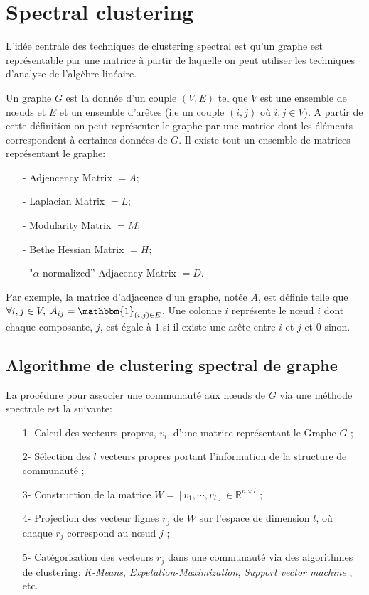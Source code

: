 \section{Spectral clustering}
L'idée centrale des techniques de clustering spectral est qu'un graphe est représentable par une matrice à partir de laquelle on peut utiliser les techniques d'analyse de l'algèbre linéaire.

Un graphe $G$ est la donnée d'un couple $(V, E)$ tel que $V$ est une ensemble de nœuds et $E$ et un ensemble d'arêtes (i.e un couple $(i,j)$ où $i,j \in V$).
A partir de cette définition on peut représenter le graphe par une matrice dont les éléments correspondent à certaines données de $G$.
Il existe tout un ensemble de matrices représentant le graphe:
\begin{itemize}
  	\item[-]  Adjencency Matrix $= A$;
  	\item[-]  Laplacian Matrix $= L$;
  	\item[-]  Modularity Matrix $= M$;
  	\item[-]  Bethe Hessian Matrix $= H$;
  	\item[-]  "$\alpha$-normalized” Adjacency Matrix $= D$.\\
\end{itemize}
Par exemple, la matrice d'adjacence d'un graphe, notée $A$, est définie telle que $\forall i,j \in V, \; A_{ij} = \mathbbm{1}_{(i,j) \in E}$.
Une colonne $i$ représente le nœud $i$ dont chaque composante, $j$, est égale à $1$ si il existe une arête entre $i$ et $j$ et $0$ sinon.\\

\subsection{Algorithme de clustering spectral de graphe}
 \label{par:algo spectral clustering}
La procédure pour associer une communauté aux nœuds de $G$ via une méthode spectrale est la suivante: 
\begin{itemize}
	\item[1-] Calcul des vecteurs propres, $v_i$, d'une matrice représentant le Graphe $G$ ;
	\item[2-] Sélection des $l$ vecteurs propres portant l'information de la structure de communauté ; 
	\item[3-] Construction de la matrice $W = [v_1, \cdots, v_l] \in \mathbb{R}^{n\times l}$ ; 
	\item[4-] Projection des vecteur lignes $r_j$ de $W$ sur l'espace de dimension $l$, où chaque $r_j$ correspond  au nœud $j$ ; 
	\item[5-] Catégorisation des vecteurs $r_j $ dans une communauté via des algorithmes de clustering: \textit{K-Means}, \textit{Expetation-Maximization}, \textit{Support vector machine }, etc.\\
\end{itemize}


